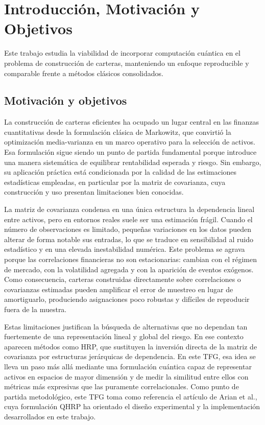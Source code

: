 \chapter{Introducción, Motivación y Objetivos}
\label{cap:introduccion}

Este trabajo estudia la viabilidad de incorporar computación cuántica en el problema de construcción de carteras, manteniendo un enfoque reproducible y comparable frente a métodos clásicos consolidados.

\section{Motivación y objetivos}
\label{sec:motivacion_objetivos}

La construcción de carteras eficientes ha ocupado un lugar central en las finanzas cuantitativas desde la formulación clásica de Markowitz\cite{markowitz1952}, que convirtió la optimización media-varianza en un marco operativo para la selección de activos. Esa formulación sigue siendo un punto de partida fundamental porque introduce una manera sistemática de equilibrar rentabilidad esperada y riesgo. Sin embargo, su aplicación práctica está condicionada por la calidad de las estimaciones estadísticas empleadas, en particular por la matriz de covarianza, cuya construcción y uso presentan limitaciones bien conocidas.

La matriz de covarianza condensa en una única estructura la dependencia lineal entre activos, pero en entornos reales suele ser una estimación frágil. Cuando el número de observaciones es limitado, pequeñas variaciones en los datos pueden alterar de forma notable sus entradas, lo que se traduce en sensibilidad al ruido estadístico y en una elevada inestabilidad numérica. Este problema se agrava porque las correlaciones financieras no son estacionarias: cambian con el régimen de mercado, con la volatilidad agregada y con la aparición de eventos exógenos. Como consecuencia, carteras construidas directamente sobre correlaciones o covarianzas estimadas pueden amplificar el error de muestreo en lugar de amortiguarlo, produciendo asignaciones poco robustas y difíciles de reproducir fuera de la muestra.

Estas limitaciones justifican la búsqueda de alternativas que no dependan tan fuertemente de una representación lineal y global del riesgo. En ese contexto aparecen métodos como \gls{HRP}\cite{lopezdeprado2016hrp}, que sustituyen la inversión directa de la matriz de covarianza por estructuras jerárquicas de dependencia. En este TFG, esa idea se lleva un paso más allá mediante una formulación cuántica capaz de representar activos en espacios de mayor dimensión y de medir la similitud entre ellos con métricas más expresivas que las puramente correlacionales. Como punto de partida metodológico, este TFG toma como referencia el artículo de Arian et al.\cite{arian2025qhrp}, cuya formulación \gls{QHRP} ha orientado el diseño experimental y la implementación desarrollados en este trabajo.

